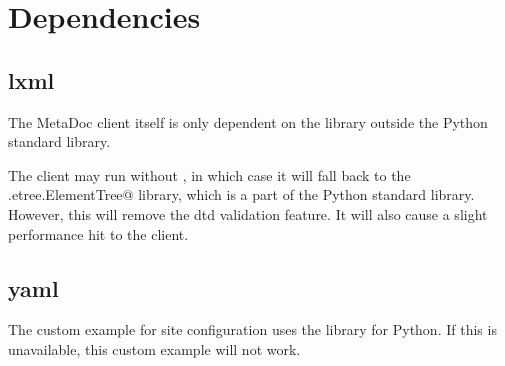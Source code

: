 \section{Dependencies}

\subsection{lxml}
The MetaDoc client itself is only dependent on the \verb@lxml@ library outside
the Python standard library. 

The client may run without \verb@lxml@, in which case it will fall back to the
\verb@xml.etree.ElementTree@ library, which is a part of the Python standard
library. However, this will remove the \gls{dtd} validation feature. It will
also cause a slight performance hit to the client.

\subsection{yaml}
The custom example for site configuration uses the \verb@yaml@ library for
Python. If this is unavailable, this custom example will not work.
